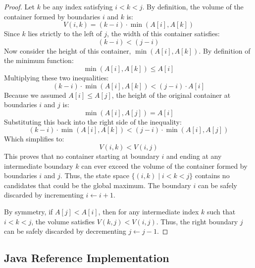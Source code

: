 \documentclass[10pt,journal,compsoc,onecolumn]{IEEEtran}
\begin{document}
\begin{proof}
Let $k$ be any index satisfying $i < k < j$. By definition, the volume of the container formed by boundaries $i$ and $k$ is:
\begin{equation}
V(i, k) = (k - i) \cdot \min(A[i], A[k])
\end{equation}
Since $k$ lies strictly to the left of $j$, the width of this container satisfies:
\begin{equation}
(k - i) < (j - i)
\end{equation}
Now consider the height of this container, $\min(A[i], A[k])$. By definition of the minimum function:
\begin{equation}
\min(A[i], A[k]) \le A[i]
\end{equation}
Multiplying these two inequalities:
\begin{equation}
(k - i) \cdot \min(A[i], A[k]) < (j - i) \cdot A[i]
\end{equation}
Because we assumed $A[i] \le A[j]$, the height of the original container at boundaries $i$ and $j$ is:
\begin{equation}
\min(A[i], A[j]) = A[i]
\end{equation}
Substituting this back into the right side of the inequality:
\begin{equation}
(k - i) \cdot \min(A[i], A[k]) < (j - i) \cdot \min(A[i], A[j])
\end{equation}
Which simplifies to:
\begin{equation}
V(i, k) < V(i, j)
\end{equation}
This proves that no container starting at boundary $i$ and ending at any intermediate boundary $k$ can ever exceed the volume of the container formed by boundaries $i$ and $j$. Thus, the state space $\{(i, k) \mid i < k < j\}$ contains no candidates that could be the global maximum. The boundary $i$ can be safely discarded by incrementing $i \leftarrow i + 1$. 

By symmetry, if $A[j] < A[i]$, then for any intermediate index $k$ such that $i < k < j$, the volume satisfies $V(k, j) < V(i, j)$. Thus, the right boundary $j$ can be safely discarded by decrementing $j \leftarrow j - 1$.
\end{proof}

\subsection{Java Reference Implementation}
\end{document}
